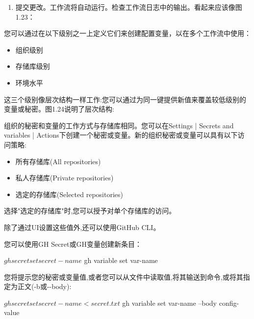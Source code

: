 \begin{enumerate}
\item 
提交更改。工作流将自动运行。检查工作流日志中的输出。看起来应该像图1.23：


\end{enumerate}


您可以通过在以下级别之一上定义它们来创建配置变量，以在多个工作流中使用：

\begin{itemize}
\item 
组织级别

\item 
存储库级别

\item 
环境水平
\end{itemize}

这三个级别像层次结构一样工作:您可以通过为同一键提供新值来覆盖较低级别的变量或秘密。图1.24说明了层次结构:


组织的秘密和变量的工作方式与存储库相同。您可以在Settings | Secrets and variables | Actions下创建一个秘密或变量。新的组织秘密或变量可以具有以下访问策略:

\begin{itemize}
\item 
所有存储库(All repositories)

\item 
私人存储库(Private repositories)

\item 
选定的存储库(Selected repositories)
\end{itemize}

选择"选定的存储库"时,您可以授予对单个存储库的访问。

除了通过UI设置这些值外,还可以使用GitHub CLI。

您可以使用GH Secret或GH变量创建新条目：

\begin{shell}
$ gh secret set secret-name
$ gh variable set var-name
\end{shell}

您将提示您的秘密或变量值,或者您可以从文件中读取值,将其输送到命令,或将其指定为正文(-b或-{}-body):

\begin{shell}
$ gh secret set secret-name < secret.txt
$ gh variable set var-name --body config-value
\end{shell}
